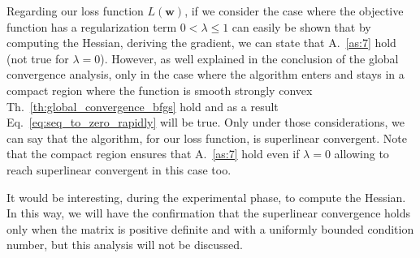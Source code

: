 \documentclass[11pt]{article}
\begin{document}
Regarding our loss function $L(\mathbf{w})$, if we consider the case where the objective function has a regularization term $0<\lambda \leq 1$ can easily be shown that by computing the Hessian, deriving the gradient, we can state that A.~\ref{as:7} hold (not true for $\lambda =0$). However, as well explained in the conclusion of the global convergence analysis, only in the case where the algorithm enters and stays in a compact region where the function is smooth strongly convex Th.~\ref{th:global_convergence_bfgs} hold and as a result Eq.~\ref{eq:seq_to_zero_rapidly} will be true. Only under those considerations, we can say that the algorithm, for our loss function, is superlinear convergent. Note that the compact region ensures that A.~\ref{as:7} hold even if $\lambda =0$ allowing to reach superlinear convergent in this case too.

It would be interesting, during the experimental phase, to compute the Hessian. In this way, we will have the confirmation that the superlinear convergence holds only when the matrix is positive definite and with a uniformly bounded condition number, but this analysis will not be discussed. 
\end{document}
